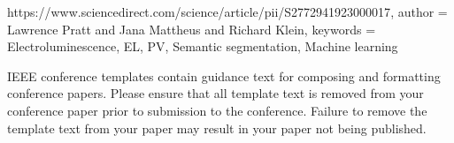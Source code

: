 \documentclass[conference]{IEEEtran}
\begin{document}
\begin{thebibliography}{00}
{            {https://www.sciencedirect.com/science/article/pii/S2772941923000017},
        author = {Lawrence Pratt and Jana Mattheus and Richard Klein},
        keywords = {Electroluminescence, EL, PV, Semantic segmentation, Machine
                learning}
    }

\end{thebibliography}

\vspace{12pt}
\color{red}
IEEE conference templates contain guidance text for composing and formatting
conference papers. Please ensure that all template text is removed from your
conference paper prior to submission to the conference. Failure to remove the
template text from your paper may result in your paper not being published.
\end{document}
